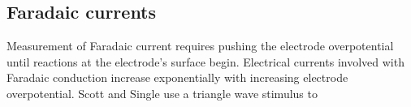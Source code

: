   \subsection{Faradaic currents}
    Measurement of Faradaic current requires pushing the electrode overpotential until reactions at the electrode's surface begin.
    Electrical currents involved with Faradaic conduction increase exponentially with increasing electrode overpotential.
    Scott and Single use a triangle wave stimulus to

